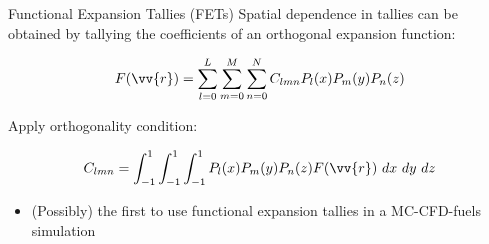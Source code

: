 \documentclass[10pt]{beamer}
\begin{document}

\begin{frame}{Functional Expansion Tallies (FETs)}
Spatial dependence in tallies can be obtained by tallying the coefficients of an orthogonal expansion function:

\begin{equation}
F(\vv{r})=\sum_{l=0}^{L}\sum_{m=0}^M\sum_{n=0}^NC_{lmn} P_l(x)P_m(y)P_n(z)
\end{equation}

Apply orthogonality condition:

\begin{equation}
C_{lmn}=\int_{-1}^1\int_{-1}^1\int_{-1}^1P_l(x)P_m(y)P_n(z)F(\vv{r})\ dx\ dy\ dz
\end{equation}

\begin{itemize}
\item (Possibly) the first to use functional expansion tallies in a MC-CFD-fuels simulation
\end{itemize}

\end{frame}
\end{document}
